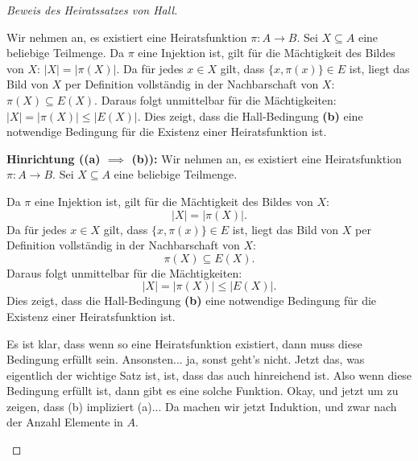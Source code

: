 \begin{proof}[Beweis des Heiratssatzes von Hall]
\begin{spoken-clean}[01:12:30 - 01:14:50]
Wir nehmen an, es existiert eine Heiratsfunktion $\pi \colon A \to B$. Sei $X \subseteq A$ eine beliebige Teilmenge. Da $\pi$ eine Injektion ist, gilt für die Mächtigkeit des Bildes von $X$: $|X| = |\pi(X)|$. Da für jedes $x \in X$ gilt, dass $\{x, \pi(x)\} \in E$ ist, liegt das Bild von $X$ per Definition vollständig in der Nachbarschaft von $X$: $\pi(X) \subseteq E(X)$. Daraus folgt unmittelbar für die Mächtigkeiten: $|X| = |\pi(X)| \le |E(X)|$. Dies zeigt, dass die Hall-Bedingung \textbf{(b)} eine notwendige Bedingung für die Existenz einer Heiratsfunktion ist.
\end{spoken-clean}

\begin{ai-global-state-checkpoint-invisible-content}
\end{ai-global-state-checkpoint-invisible-content}

\begin{math-stroke}
\textbf{Hinrichtung (\texorpdfstring{\textbf{(a)} $\implies$ \textbf{(b)}}{a -> b}):}
Wir nehmen an, es existiert eine Heiratsfunktion $\pi \colon A \to B$. Sei $X \subseteq A$ eine beliebige Teilmenge.
        
Da $\pi$ eine Injektion ist, gilt für die Mächtigkeit des Bildes von $X$:
\[
|X| = |\pi(X)|.
\]
Da für jedes $x \in X$ gilt, dass $\{x, \pi(x)\} \in E$ ist, liegt das Bild von $X$ per Definition vollständig in der Nachbarschaft von $X$:
\[
\pi(X) \subseteq E(X).
\]
Daraus folgt unmittelbar für die Mächtigkeiten:
\[
|X| = |\pi(X)| \le |E(X)|.
\]
Dies zeigt, dass die Hall-Bedingung \textbf{(b)} eine notwendige Bedingung für die Existenz einer Heiratsfunktion ist.
\end{math-stroke}

\begin{spoken-clean}[01:14:50 - 01:16:15]
Es ist klar, dass wenn so eine Heiratsfunktion existiert, dann muss diese Bedingung erfüllt sein. Ansonsten... ja, sonst geht's nicht. Jetzt das, was eigentlich der wichtige Satz ist, ist, dass das auch hinreichend ist. Also wenn diese Bedingung erfüllt ist, dann gibt es eine solche Funktion. Okay, und jetzt um zu zeigen, dass (b) impliziert (a)... Da machen wir jetzt Induktion, und zwar nach der Anzahl Elemente in $A$.
\end{spoken-clean}


\end{proof}

